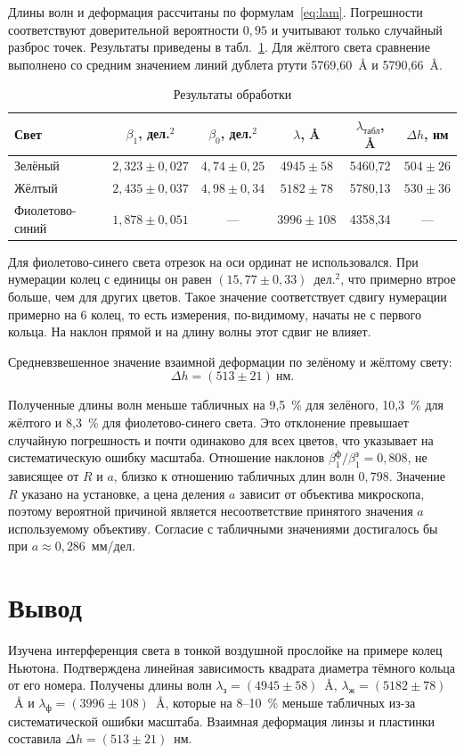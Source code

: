 \documentclass[14pt,a4paper]{extarticle}
\begin{document}
Длины волн и деформация рассчитаны по формулам~\eqref{eq:lam}. Погрешности соответствуют доверительной вероятности $0{,}95$ и учитывают только случайный разброс точек. Результаты приведены в табл.~\ref{tab:res}. Для жёлтого света сравнение выполнено со средним значением линий дублета ртути 5769,60~\AA{} и 5790,66~\AA.

\begin{table}[H]
\caption{Результаты обработки}
\label{tab:res}
\centering
\small
\setlength{\tabcolsep}{4pt}
\renewcommand{\arraystretch}{1.2}
\begin{tabular}{lccccc}
\toprule
Свет & $\beta_1$, дел.$^2$ & $\beta_0$, дел.$^2$ & $\lambda$, \AA & $\lambda_{\text{табл}}$, \AA & $\Delta h$, нм \\
\midrule
Зелёный & $2{,}323 \pm 0{,}027$ & $4{,}74 \pm 0{,}25$ & $4945 \pm 58$ & 5460,72 & $504 \pm 26$ \\
Жёлтый & $2{,}435 \pm 0{,}037$ & $4{,}98 \pm 0{,}34$ & $5182 \pm 78$ & 5780,13 & $530 \pm 36$ \\
Фиолетово-синий & $1{,}878 \pm 0{,}051$ & --- & $3996 \pm 108$ & 4358,34 & --- \\
\bottomrule
\end{tabular}
\end{table}

Для фиолетово-синего света отрезок на оси ординат не использовался. При нумерации колец с единицы он равен $(15{,}77 \pm 0{,}33)$~дел.$^2$, что примерно втрое больше, чем для других цветов. Такое значение соответствует сдвигу нумерации примерно на 6 колец, то есть измерения, по-видимому, начаты не с первого кольца. На наклон прямой и на длину волны этот сдвиг не влияет.

Средневзвешенное значение взаимной деформации по зелёному и жёлтому свету:
\[
  \Delta h = (513 \pm 21)~\text{нм}.
\]

Полученные длины волн меньше табличных на 9,5~\% для зелёного, 10,3~\% для жёлтого и 8,3~\% для фиолетово-синего света. Это отклонение превышает случайную погрешность и почти одинаково для всех цветов, что указывает на систематическую ошибку масштаба. Отношение наклонов $\beta_1^{\text{ф}}/\beta_1^{\text{з}} = 0{,}808$, не зависящее от $R$ и $a$, близко к отношению табличных длин волн $0{,}798$. Значение $R$ указано на установке, а цена деления $a$ зависит от объектива микроскопа, поэтому вероятной причиной является несоответствие принятого значения $a$ используемому объективу. Согласие с табличными значениями достигалось бы при $a \approx 0{,}286$~мм/дел.

\section*{Вывод}

Изучена интерференция света в тонкой воздушной прослойке на примере колец Ньютона. Подтверждена линейная зависимость квадрата диаметра тёмного кольца от его номера. Получены длины волн $\lambda_{\text{з}} = (4945 \pm 58)$~\AA, $\lambda_{\text{ж}} = (5182 \pm 78)$~\AA{} и $\lambda_{\text{ф}} = (3996 \pm 108)$~\AA, которые на 8--10~\% меньше табличных из-за систематической ошибки масштаба. Взаимная деформация линзы и пластинки составила $\Delta h = (513 \pm 21)$~нм.
\end{document}
